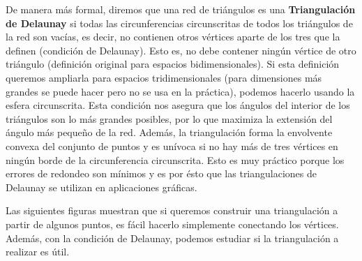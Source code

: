 De manera más formal, diremos que una red de triángulos es una \textbf{Triangulación de Delaunay} si todas las circunferencias circunscritas de todos los triángulos de la red son vacías, es decir, no contienen otros vértices aparte de los tres que la definen (condición de Delaunay). Esto es, no debe contener ningún vértice de otro triángulo (definición original para espacios bidimensionales). Si esta definición queremos ampliarla para espacios tridimensionales (para dimensiones más grandes se puede hacer pero no se usa en la práctica), podemos hacerlo usando la esfera circunscrita. Esta condición nos asegura que los ángulos del interior de los triángulos son lo más grandes posibles, por lo que maximiza la extensión del ángulo más pequeño de la red. Además, la triangulación forma la envolvente convexa del conjunto de puntos y es unívoca si no hay más de tres vértices en ningún borde de la circunferencia circunscrita. Esto es muy práctico porque los errores de redondeo son mínimos y es por ésto que las triangulaciones de Delaunay se utilizan en aplicaciones gráficas.
\vspace{0.3cm}

Las siguientes figuras muestran que si queremos construir una triangulación a partir de algunos puntos, es fácil hacerlo simplemente conectando los vértices. Además, con la condición de Delaunay, podemos estudiar si la triangulación a realizar es útil.


